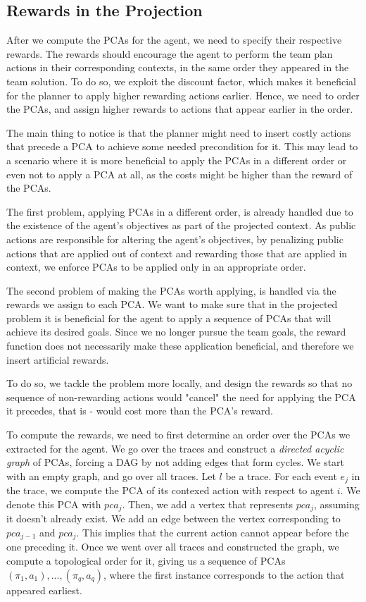 \documentclass[letterpaper]{article} %
\begin{document}
\subsection{Rewards in the Projection}

After we compute the PCAs for the agent, we need to specify their respective rewards. The rewards should encourage the agent to perform the team plan actions in their corresponding contexts, in the same order they appeared in the team solution. 
To do so, we exploit the discount factor, which makes it beneficial for the planner to apply higher rewarding actions earlier. Hence, we need to order the PCAs, and assign higher rewards to actions that appear earlier in the order.

The main thing to notice is that the planner might need to insert costly actions that precede a PCA to achieve some needed precondition for it. This may lead to a scenario where it is more beneficial to apply the PCAs in a different order or even not to apply a PCA at all, as the costs might be higher than the reward of the PCAs.

The first problem, applying PCAs in a different order, is already handled due to the existence of the agent's objectives as part of the projected context. As public actions are responsible for altering the agent's objectives, by penalizing public actions that are applied out of context and rewarding those that are applied in context, we enforce PCAs to be applied only in an appropriate order.

The second problem of making the PCAs worth applying, is handled via the rewards we assign to each PCA. We want to make sure that in the projected problem it is beneficial for the agent to apply a sequence of PCAs that will achieve its desired goals. Since we no longer pursue the team goals, the reward function does not necessarily make these application beneficial, and therefore we insert artificial rewards.

To do so, we tackle the problem more locally, and design the rewards so that no sequence of non-rewarding actions would "cancel" the need for applying the PCA it precedes, that is - would cost more than the PCA's reward.

To compute the rewards, we need to first determine an order over the PCAs we extracted for the agent.
We go over the traces and construct a \emph{directed acyclic graph} of PCAs, forcing a DAG by not adding edges that form cycles.
We start with an empty graph, and go over all traces. Let $l$ be a trace. For each event $e_j$ in the trace, we compute the PCA of its contexed action with respect to agent $i$. We denote this PCA with $pca_j$.
Then, we add a vertex that represents $pca_j$, assuming it doesn't already exist. We add an edge between the vertex corresponding to $pca_{j-1}$ and $pca_j$.
This implies that the current action cannot appear before the one preceding it.
Once we went over all traces and constructed the graph, we compute a topological order
for it, giving us a sequence of PCAs $(\pi_1, a_1),..., (\pi_q, a_q)$, where the first instance corresponds to the action that appeared earliest.
\end{document}
